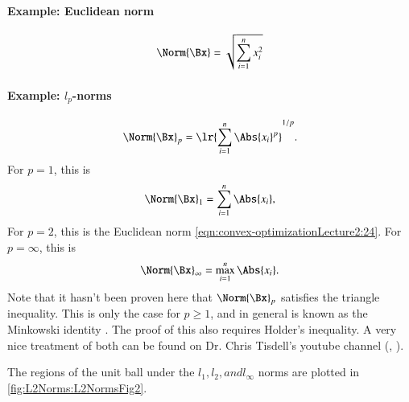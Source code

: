 \paragraph{Example: Euclidean norm}
%
\begin{equation}\label{eqn:convex-optimizationLecture2:24}
\Norm{\Bx} = \sqrt{ \sum_{i = 1}^n x_i^2 }
\end{equation}
%
\paragraph{Example: \(l_p\)-norms}
%
\begin{equation}\label{eqn:convex-optimizationLecture2:44}
\Norm{\Bx}_p = \lr{ \sum_{i = 1}^n \Abs{x_i}^p }^{1/p}.
\end{equation}
%
For \( p = 1 \), this is
%
\begin{equation}\label{eqn:convex-optimizationLecture2:64}
\Norm{\Bx}_1 = \sum_{i = 1}^n \Abs{x_i},
\end{equation}
%
For \( p = 2 \), this is the Euclidean norm \cref{eqn:convex-optimizationLecture2:24}.
For \( p = \infty \), this is
%
\begin{equation}\label{eqn:convex-optimizationLecture2:324}
\Norm{\Bx}_\infty = \max_{i = 1}^n \Abs{x_i}.
\end{equation}
%
Note that it hasn't been proven here that \( \Norm{\Bx}_p \) satisfies the triangle inequality.  This is only the case for \( p \ge 1 \), and in general is known as the Minkowski identity \citep{triangleInequalityMathSE}.  The proof of this also requires Holder's inequality.  A very nice treatment of both can be found on Dr. Chris Tisdell's youtube channel (\citep{tisdellMinkowski}, \citep{tisdellHolder}).


The regions of the unit ball under the \( l_1, l_2, and l_\infty \) norms are plotted in \cref{fig:L2Norms:L2NormsFig2}.


